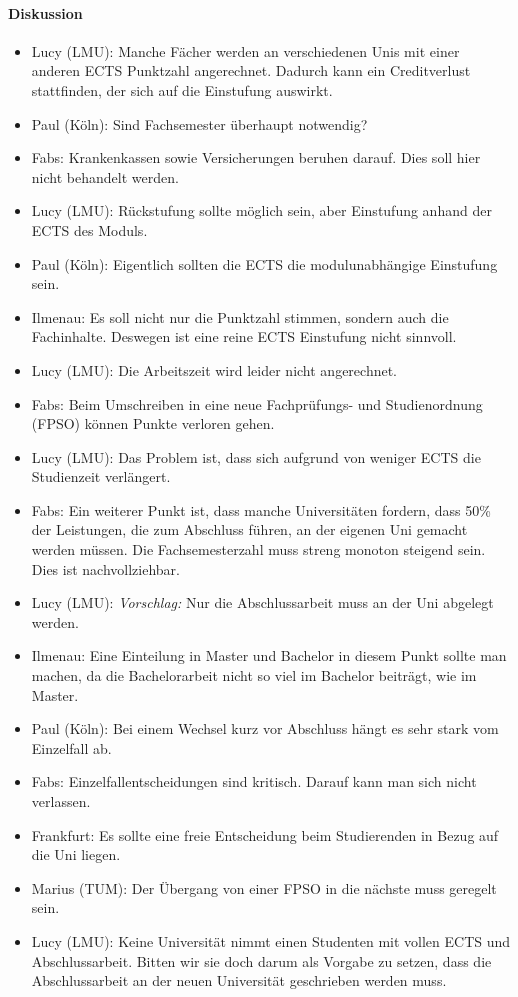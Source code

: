       \paragraph{Diskussion}
        \begin{itemize}
          \item Lucy (LMU): Manche Fächer werden an verschiedenen Unis mit einer anderen ECTS Punktzahl angerechnet. Dadurch kann ein Creditverlust stattfinden, der sich auf die Einstufung auswirkt.
          \item Paul (Köln): Sind Fachsemester überhaupt notwendig?
          \item Fabs: Krankenkassen sowie Versicherungen beruhen darauf. Dies soll hier nicht behandelt werden.
          \item Lucy (LMU): Rückstufung sollte möglich sein, aber Einstufung anhand der ECTS des Moduls.
          \item Paul (Köln): Eigentlich sollten die ECTS die modulunabhängige Einstufung sein.
          \item Ilmenau: Es soll nicht nur die Punktzahl stimmen, sondern auch die Fachinhalte. Deswegen ist eine reine ECTS Einstufung nicht sinnvoll.
          \item Lucy (LMU): Die Arbeitszeit wird leider nicht angerechnet.
          \item Fabs: Beim Umschreiben in eine neue Fachprüfungs- und Studienordnung (FPSO) können Punkte verloren gehen.
          \item Lucy (LMU): Das Problem ist, dass sich aufgrund von weniger ECTS die Studienzeit verlängert.
          \item Fabs: Ein weiterer Punkt ist, dass manche Universitäten fordern, dass 50\% der Leistungen, die zum Abschluss führen, an der eigenen Uni gemacht werden müssen. Die Fachsemesterzahl muss streng monoton steigend sein. Dies ist nachvollziehbar.
          \item Lucy (LMU): \textit{Vorschlag:} Nur die Abschlussarbeit muss an der Uni abgelegt werden.
          \item Ilmenau: Eine Einteilung in Master und Bachelor in diesem Punkt sollte man machen, da die Bachelorarbeit nicht so viel im Bachelor beiträgt, wie im Master.
          \item Paul (Köln): Bei einem Wechsel kurz vor Abschluss hängt es sehr stark vom Einzelfall ab.
          \item Fabs: Einzelfallentscheidungen sind kritisch. Darauf kann man sich nicht verlassen.
          \item Frankfurt: Es sollte eine freie Entscheidung beim Studierenden in Bezug auf die Uni liegen.
          \item Marius (TUM): Der Übergang von einer FPSO in die nächste muss geregelt sein.
          \item Lucy (LMU): Keine Universität nimmt einen Studenten mit vollen ECTS und Abschlussarbeit. Bitten wir sie doch darum als Vorgabe zu setzen, dass die Abschlussarbeit an der neuen Universität geschrieben werden muss.
        \end{itemize}
